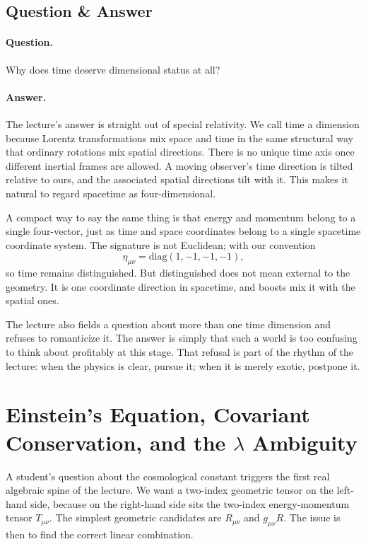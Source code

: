 \subsection{Question \& Answer}

\paragraph{Question.} Why does time deserve dimensional status at all?

\paragraph{Answer.} The lecture's answer is straight out of special relativity. We call time a dimension because Lorentz transformations mix space and time in the same structural way that ordinary rotations mix spatial directions. There is no unique time axis once different inertial frames are allowed. A moving observer's time direction is tilted relative to ours, and the associated spatial directions tilt with it. This makes it natural to regard spacetime as four-dimensional.

A compact way to say the same thing is that energy and momentum belong to a single four-vector, just as time and space coordinates belong to a single spacetime coordinate system. The signature is not Euclidean; with our convention
\begin{equation}
\eta_{\mu\nu}=\mathrm{diag}(1,-1,-1,-1),
\end{equation}
so time remains distinguished. But distinguished does not mean external to the geometry. It is one coordinate direction in spacetime, and boosts mix it with the spatial ones.

The lecture also fields a question about more than one time dimension and refuses to romanticize it. The answer is simply that such a world is too confusing to think about profitably at this stage. That refusal is part of the rhythm of the lecture: when the physics is clear, pursue it; when it is merely exotic, postpone it.

\section{Einstein's Equation, Covariant Conservation, and the \(\lambda\) Ambiguity}

A student's question about the cosmological constant triggers the first real algebraic spine of the lecture. We want a two-index geometric tensor on the left-hand side, because on the right-hand side sits the two-index energy-momentum tensor \(T_{\mu\nu}\). The simplest geometric candidates are \(R_{\mu\nu}\) and \(g_{\mu\nu}R\). The issue is then to find the correct linear combination.

